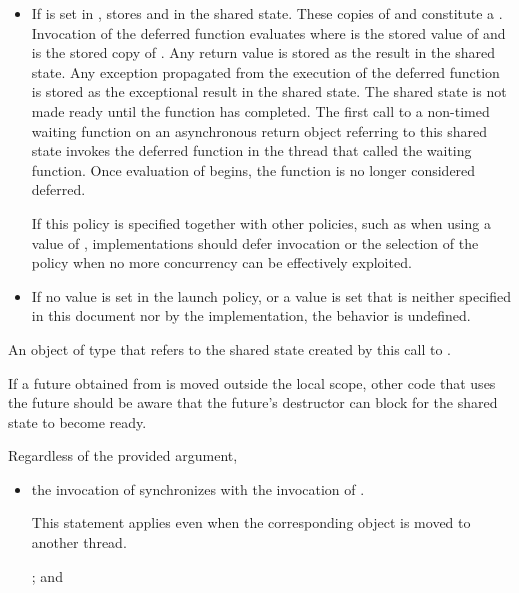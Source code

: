 \begin{itemdescr}
\begin{itemize}
\item
If  is set in ,
stores  and
in the shared state. These copies of  and  constitute
a . Invocation of the deferred function evaluates
 where  is the stored value of
 and  is the stored copy of
.
Any return value is stored
as the result in the shared state.
Any exception propagated
from the execution
of the deferred function
is stored as the exceptional result
in the shared state.
The shared state is not
made ready until the function has completed. The first call to a
non-timed waiting function
on an asynchronous return object referring to
this shared state invokes the
deferred function in the thread that called the waiting function.
Once evaluation of  begins, the function is no longer
considered deferred.
\begin{note}
If this policy is specified together with other policies, such as when using a
 value of , implementations should defer
invocation or the selection of the policy when no more concurrency can be effectively
exploited.
\end{note}

\item
If no value is set in the launch policy, or a value is set that is neither specified
in this document nor by the implementation, the behavior is undefined.
\end{itemize}

\pnum
\returns
An object of type
 that refers
to the shared state created by this call to .
\begin{note}
If a future obtained from  is moved outside the local scope,
other code that uses the future should be aware that the future's destructor can
block for the shared state to become ready.
\end{note}

\pnum
\sync
Regardless of the provided  argument,
\begin{itemize}
\item
the invocation of 
synchronizes with the invocation of .
\begin{note}
This statement applies even when the corresponding  object is moved to
another thread.
\end{note}
; and


\end{itemize}
\end{itemdescr}
